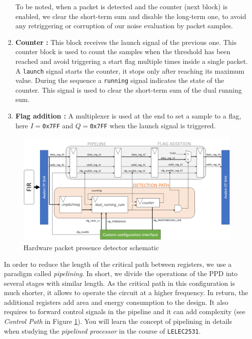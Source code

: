 \begin{enumerate}
    To be noted, when a packet is detected and the counter (next block) is enabled, we clear the short-term sum and disable the long-term one, to avoid any retriggering or corruption of our noise evaluation by packet samples.


    \item \textbf{Counter :} This block receives the launch signal of the previous one. This counter block is used to count the samples when the threshold has been reached and avoid triggering a start flag multiple times inside a single packet. A \texttt{launch} signal starts the counter, it stops only after reaching its maximum value. During the sequence a \texttt{running} signal indicates the state of the counter. This signal is used to clear the short-term sum of the dual running sum.

    \item \textbf{Flag addition :} A multiplexer is used at the end to set a sample to a flag, here $I=$\texttt{0x7FF} and $Q=$\texttt{0x7FF}  when the launch signal is triggered.

\end{enumerate}


\begin{figure}[h]
    \centering
    \includegraphics[width=\linewidth]{figures/packet_presence_detection.png}
    \caption{Hardware packet presence detector schematic}
    \label{fig:pd_schematic}
\end{figure}

In order to reduce the length of the critical path between registers, we use a paradigm called \textit{pipelining}. In short, we divide the operations of the PPD into several stages with similar length. As the critical path in this configuration is much shorter, it allows to operate the circuit at a higher frequency. In return, the additional registers add area and energy consumption to the design. It also requires to forward control signals in the pipeline and it can add complexity (see \textit{Control Path} in Figure \ref{fig:pd_schematic}). You will learn the concept of pipelining in details when studying the \textit{pipelined processor} in the course of \texttt{LELEC2531}.


